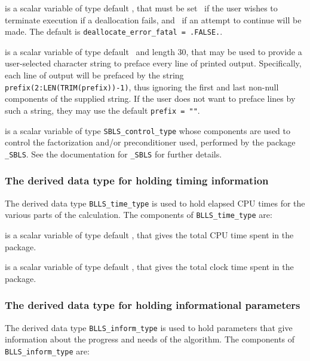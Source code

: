 \documentclass{galahad}
\newcommand{\packagename}{BLLS}
\begin{document}
\begin{description}
 is a scalar variable of type default \logical,
that must be set \true\ if the user wishes to terminate execution if
a deallocation  fails, and \false\ if an attempt to continue
will be made. The default is {\tt deallocate\_error\_fatal = .FALSE.}.

 is a scalar variable of type default \character\
and length 30, that may be used to provide a user-selected
character string to preface every line of printed output.
Specifically, each line of output will be prefaced by the string
{\tt prefix(2:LEN(TRIM(prefix))-1)},
thus ignoring the first and last non-null components of the
supplied string. If the user does not want to preface lines by such
a string, they may use the default {\tt prefix = ""}.

 is a scalar variable of type
{\tt SBLS\_control\_type} %
whose components are used to control the factorization and/or
preconditioner used,
performed by the package
{\tt \libraryname\_SBLS}.
See the documentation for {\tt \libraryname\_SBLS} for further details.

\end{description}


\subsubsection{The derived data type for holding timing
 information}\label{typetime}
The derived data type
{\tt \packagename\_time\_type}
is used to hold elapsed CPU times for the various parts of the calculation.
The components of
{\tt \packagename\_time\_type}
are:
\begin{description}
 is a scalar variable of type default \real, that gives
 the total CPU time spent in the package.

 is a scalar variable of type default \real, that gives
 the total clock time spent in the package.

\end{description}


\subsubsection{The derived data type for holding informational
 parameters}\label{typeinform}
The derived data type
{\tt \packagename\_inform\_type}
is used to hold parameters that give information about the progress and needs
of the algorithm. The components of
{\tt \packagename\_inform\_type}
are:
\end{document}

